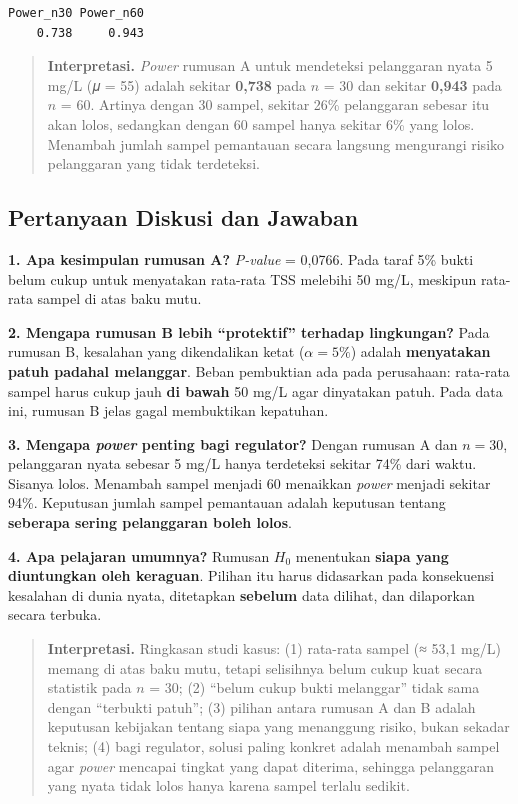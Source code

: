 \documentclass[
  indonesian,
  letterpaper,
]{book}
\begin{document}
\begin{verbatim}
Power_n30 Power_n60 
    0.738     0.943 
\end{verbatim}

\begin{quote}
\textbf{Interpretasi.} \emph{Power} rumusan A untuk mendeteksi
pelanggaran nyata 5 mg/L (𝜇 = 55) adalah sekitar \textbf{0,738} pada
\(n\) = 30 dan sekitar \textbf{0,943} pada \(n\) = 60. Artinya dengan 30
sampel, sekitar 26\% pelanggaran sebesar itu akan lolos, sedangkan
dengan 60 sampel hanya sekitar 6\% yang lolos. Menambah jumlah sampel
pemantauan secara langsung mengurangi risiko pelanggaran yang tidak
terdeteksi.
\end{quote}

\subsection{Pertanyaan Diskusi dan
Jawaban}\label{pertanyaan-diskusi-dan-jawaban-1}

\textbf{1. Apa kesimpulan rumusan A?} \emph{P-value} = 0,0766. Pada
taraf 5\% bukti belum cukup untuk menyatakan rata-rata TSS melebihi 50
mg/L, meskipun rata-rata sampel di atas baku mutu.

\textbf{2. Mengapa rumusan B lebih ``protektif'' terhadap lingkungan?}
Pada rumusan B, kesalahan yang dikendalikan ketat (\(\alpha = 5\%\))
adalah \textbf{menyatakan patuh padahal melanggar}. Beban pembuktian ada
pada perusahaan: rata-rata sampel harus cukup jauh \textbf{di bawah} 50
mg/L agar dinyatakan patuh. Pada data ini, rumusan B jelas gagal
membuktikan kepatuhan.

\textbf{3. Mengapa \emph{power} penting bagi regulator?} Dengan rumusan
A dan \(n = 30\), pelanggaran nyata sebesar 5 mg/L hanya terdeteksi
sekitar 74\% dari waktu. Sisanya lolos. Menambah sampel menjadi 60
menaikkan \emph{power} menjadi sekitar 94\%. Keputusan jumlah sampel
pemantauan adalah keputusan tentang \textbf{seberapa sering pelanggaran
boleh lolos}.

\textbf{4. Apa pelajaran umumnya?} Rumusan \(H_0\) menentukan
\textbf{siapa yang diuntungkan oleh keraguan}. Pilihan itu harus
didasarkan pada konsekuensi kesalahan di dunia nyata, ditetapkan
\textbf{sebelum} data dilihat, dan dilaporkan secara terbuka.

\begin{quote}
\textbf{Interpretasi.} Ringkasan studi kasus: (1) rata-rata sampel (≈
53,1 mg/L) memang di atas baku mutu, tetapi selisihnya belum cukup kuat
secara statistik pada \(n\) = 30; (2) ``belum cukup bukti melanggar''
tidak sama dengan ``terbukti patuh''; (3) pilihan antara rumusan A dan B
adalah keputusan kebijakan tentang siapa yang menanggung risiko, bukan
sekadar teknis; (4) bagi regulator, solusi paling konkret adalah
menambah sampel agar \emph{power} mencapai tingkat yang dapat diterima,
sehingga pelanggaran yang nyata tidak lolos hanya karena sampel terlalu
sedikit.
\end{quote}
\end{document}

